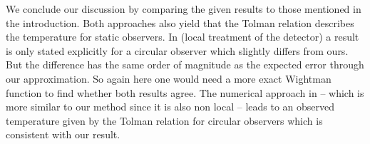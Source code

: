 We conclude our discussion by comparing the given results to those mentioned in the introduction. Both approaches also yield that the Tolman relation describes the temperature for static observers. In \cite{smerlak} (local treatment of the detector) a result is only stated explicitly for a circular observer which slightly differs from ours. But the difference has  the same order of magnitude as the expected error through our approximation. So again here one would need a more exact Wightman function to find whether both results agree. The numerical approach in \cite{Hodgkinson} -- which is more similar to our method since it is also non local -- leads to an observed temperature given by the Tolman relation for circular observers which is consistent with our result.    

  